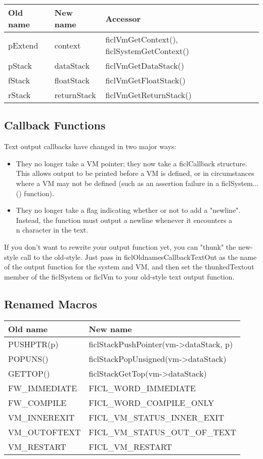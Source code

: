 \begin{tabular}{| l | l | l |}
	\hline
	\textbf{Old name} & \textbf{New name} & \textbf{Accessor} \\ \hline
	pExtend & context & ficlVmGetContext(), ficlSystemGetContext() \\ \hline
	pStack & dataStack & ficlVmGetDataStack() \\ \hline
	fStack & floatStack & ficlVmGetFloatStack() \\ \hline
	rStack & returnStack & ficlVmGetReturnStack() \\
	\hline
\end{tabular}


\subsection{Callback Functions}
Text output callbacks have changed in two major ways:
\begin{itemize}[noitemsep]
	\item They no longer take a VM pointer; they now take a
	ficlCallback structure. This allows output to be printed before
	a VM is defined, or in circumstances where a VM may not be
	defined (such as an assertion failure in a ficlSystem...()
	function).

	\item They no longer take a flag indicating whether or not to
	add a "newline". Instead, the function must output a newline
	whenever it encounters a \\n character in the text.
\end{itemize}
If you don't want to rewrite your output function yet, you can "thunk"
the new-style call to the old-style. Just pass in
ficlOldnamesCallbackTextOut as the name of the output function for the
system and VM, and then set the thunkedTextout member of the ficlSystem
or ficlVm to your old-style text output function.


\subsection{Renamed Macros}
\begin{tabular}{| l | l |}
	\hline
	\textbf{Old name} & \textbf{New name} \\ \hline
	PUSHPTR(p) & ficlStackPushPointer(vm-\textgreater dataStack, p) \\ \hline
	POPUNS() & ficlStackPopUnsigned(vm-\textgreater dataStack) \\ \hline
	GETTOP() & ficlStackGetTop(vm-\textgreater dataStack) \\ \hline
	FW\_IMMEDIATE & FICL\_WORD\_IMMEDIATE \\ \hline
	FW\_COMPILE & FICL\_WORD\_COMPILE\_ONLY \\ \hline
	VM\_INNEREXIT & FICL\_VM\_STATUS\_INNER\_EXIT \\ \hline
	VM\_OUTOFTEXT & FICL\_VM\_STATUS\_OUT\_OF\_TEXT \\ \hline
	VM\_RESTART & FICL\_VM\_RESTART \\
	\hline
\end{tabular}


